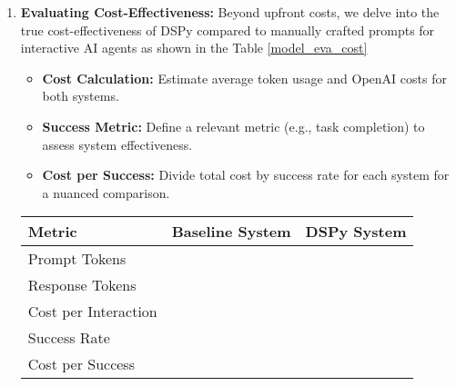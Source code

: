\begin{enumerate}
    \item \textbf{Evaluating Cost-Effectiveness:} Beyond upfront costs, we delve into the true cost-effectiveness of DSPy compared to manually crafted prompts for interactive AI agents as shown in the Table \ref{model_eva_cost}

    \begin{itemize}
        \item \textbf{Cost Calculation:} Estimate average token usage and OpenAI costs for both systems.
        \item \textbf{Success Metric:} Define a relevant metric (e.g., task completion) to assess system effectiveness.
        \item \textbf{Cost per Success:} Divide total cost by success rate for each system for a nuanced comparison.
    \end{itemize}

    \begin{center}
        \label{model_eva_cost}
        \begin{tabular}{ |p{5cm}|p{2.5cm}|p{2.5cm}|  }
        \hline \textbf{Metric} & \textbf{Baseline System} & \textbf{DSPy System}\\
        \hline
        Prompt Tokens&&\\
        \hline
        Response Tokens&&\\
        \hline
        Cost per Interaction&&\\
        \hline
        Success Rate&&\\
        \hline
        Cost per Success&&\\
        \hline
        \end{tabular}
    \end{center}
\end{enumerate}

